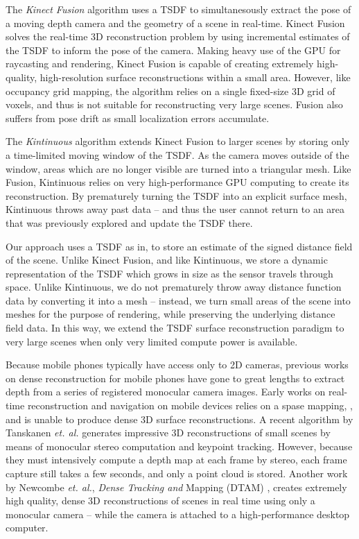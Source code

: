 \documentclass[conference,10pt]{IEEEtran}
\begin{document}
The \emph{Kinect Fusion} \cite{Newcombe} algorithm uses a TSDF to
simultanesously extract the pose of a moving depth camera and the geometry of a
scene in real-time. Kinect Fusion solves the real-time 3D reconstruction problem
by using incremental estimates of the TSDF to inform the pose of the camera.
Making heavy use of the GPU for raycasting and rendering, Kinect Fusion is
capable of creating extremely high-quality, high-resolution surface 
reconstructions within a small area. However, like occupancy grid mapping, the
algorithm relies on a single fixed-size 3D grid of voxels, and thus is not
suitable for reconstructing very large scenes. Fusion also suffers from pose
drift as small localization errors accumulate.

The \emph{Kintinuous} \cite{Whelan2013} algorithm extends Kinect Fusion to
larger scenes by storing only a time-limited moving window of the TSDF. As the camera
moves outside of the window, areas which are no longer visible are turned into a
triangular mesh. Like Fusion, Kintinuous relies on very high-performance GPU
computing to create its reconstruction.  By prematurely turning the TSDF into an
explicit surface mesh, Kintinuous throws away past data -- and thus the user
cannot return to an area that was previously explored and update the TSDF there.

Our approach uses a TSDF as in\cite{Curless1996,Newcombe,Whelan2013,Bylow2013},
to store an estimate of the signed distance field of the scene. Unlike Kinect
Fusion, and like Kintinuous, we store a dynamic representation of the TSDF
which grows in size as the sensor travels through space. Unlike Kintinuous, we
do not prematurely throw away distance function data by converting it into a
mesh -- instead, we turn small areas of the scene into meshes for the purpose
of rendering, while preserving the underlying distance field data. In this way,
we extend the TSDF surface reconstruction paradigm to very large scenes when only
very limited compute power is available.

Because mobile phones typically have access only to 2D cameras, previous works
on dense reconstruction for mobile phones have gone to great lengths to extract
depth from a series of registered monocular camera images.  Early works on
real-time reconstruction and navigation on mobile devices relies on a spase
mapping, \cite{KleinSparse}, and is unable to produce dense 3D surface
reconstructions.  A recent algorithm by Tanskanen \emph{et. al.}
\cite{TanskanenMetric} generates impressive 3D reconstructions of small scenes
by means of monocular stereo computation and keypoint tracking. However,
because they \cite{TanskanenMetric} must intensively compute a depth map at
each frame by stereo, each frame capture still takes a few seconds, and only a
point cloud is stored. Another work by Newcombe \emph{et. al.}, \textit{Dense
Tracking and} Mapping (DTAM) \cite{DTAM},  creates extremely high quality,
dense 3D reconstructions of scenes in real time using only a monocular camera
-- while the camera is attached to a high-performance desktop computer. 
\end{document}
